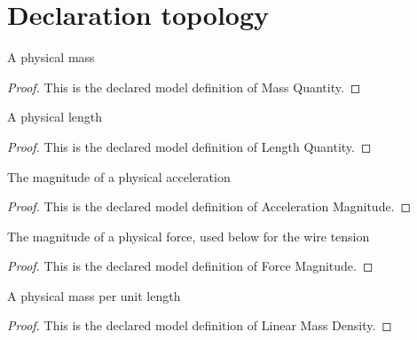 \section{Declaration topology}
\begin{definition}
  \label{def:physics:phyx-mini-0181:phyxminiproblems-problemphyxmini0181-massquantity}
  A physical mass
\end{definition}
\begin{proof}
  This is the declared model definition of Mass Quantity.
\end{proof}
\begin{definition}
  \label{def:physics:phyx-mini-0181:phyxminiproblems-problemphyxmini0181-lengthquantity}
  A physical length
\end{definition}
\begin{proof}
  This is the declared model definition of Length Quantity.
\end{proof}
\begin{definition}
  \label{def:physics:phyx-mini-0181:phyxminiproblems-problemphyxmini0181-accelerationmagnitude}
  The magnitude of a physical acceleration
\end{definition}
\begin{proof}
  This is the declared model definition of Acceleration Magnitude.
\end{proof}
\begin{definition}
  \label{def:physics:phyx-mini-0181:phyxminiproblems-problemphyxmini0181-forcemagnitude}
  The magnitude of a physical force, used below for the wire tension
\end{definition}
\begin{proof}
  This is the declared model definition of Force Magnitude.
\end{proof}
\begin{definition}
  \label{def:physics:phyx-mini-0181:phyxminiproblems-problemphyxmini0181-linearmassdensity}
  A physical mass per unit length
\end{definition}
\begin{proof}
  This is the declared model definition of Linear Mass Density.
\end{proof}

